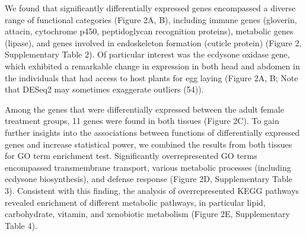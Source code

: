 \documentclass[lineno]{wiley-article}
\begin{document}
We found that significantly differentially expressed genes encompassed a diverse range of functional categories (Figure 2A, B), including immune genes (gloverin, attacin, cytochrome p450, peptidoglycan recognition proteins), metabolic genes (lipase), and genes involved in endoskeleton formation (cuticle protein) (Figure 2, Supplementary Table 2). Of particular interest was the ecdysone oxidase gene, which exhibited a remarkable change in expression in both head and abdomen in the individuals that had access to host plants for egg laying (Figure 2A, B; Note that DESeq2 may sometimes exaggerate outliers (54)).

Among the genes that were differentially expressed between the adult female treatment groups, 11 genes were found in both tissues (Figure 2C). To gain further insights into the associations between functions of differentially expressed genes and increase statistical power, we combined the results from both tissues for GO term enrichment test. Significantly overrepresented GO terms encompassed transmembrane transport, various metabolic processes (including ecdysone biosynthesis), and defense response (Figure 2D, Supplementary Table 3). Consistent with this finding, the analysis of overrepresented KEGG pathways revealed enrichment of different metabolic pathways, in particular lipid, carbohydrate, vitamin, and xenobiotic metabolism (Figure 2E, Supplementary Table 4).

\afterpage{\FloatBarrier}
\end{document}
